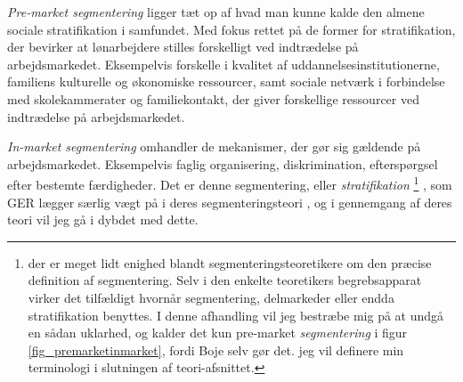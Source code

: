 










\emph{Pre-market segmentering } ligger tæt op af hvad man kunne kalde den almene sociale stratifikation i samfundet. Med fokus rettet på de former for stratifikation, der bevirker at lønarbejdere stilles forskelligt ved indtrædelse på arbejdsmarkedet.
Eksempelvis forskelle i kvalitet af uddannelsesinstitutionerne, familiens kulturelle og økonomiske ressourcer, samt  sociale netværk i forbindelse med skolekammerater og familiekontakt, der giver forskellige ressourcer ved indtrædelse på arbejdsmarkedet. 

\emph{In-market segmentering} omhandler de mekanismer, der gør sig gældende på arbejdsmarkedet. Eksempelvis faglig organisering, diskrimination, efterspørgsel efter bestemte færdigheder. Det er denne segmentering, eller \emph{stratifikation}%
%
\footnote{der er meget lidt enighed blandt segmenteringsteoretikere om den præcise definition af segmentering. Selv i den enkelte teoretikers begrebsapparat virker det tilfældigt hvornår segmentering, delmarkeder eller endda stratifikation benyttes. I denne afhandling vil jeg bestræbe mig på at undgå en sådan uklarhed, og kalder det kun pre-market \emph{segmentering} i figur \ref{fig_premarketinmarket}, fordi Boje selv gør det. jeg vil definere min terminologi i slutningen af teori-afsnittet.}%
%
, som GER lægger særlig vægt på i deres segmenteringsteori \parencite[46]{Boje1985}, og i gennemgang af deres teori vil jeg gå i dybdet med dette. 

